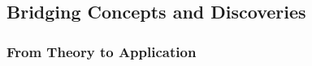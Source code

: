 

\renewcommand\thefigure{B\arabic{figure}} %
\renewcommand\thetable{B\arabic{table}}  
\renewcommand\theequation{B\arabic{equation}}
\setcounter{figure}{0}    
\setcounter{table}{0}
\setcounter{equation}{0}


\subsection*{Bridging Concepts and Discoveries}

\subsubsection*{From Theory to Application}

\newpage
\clearpage